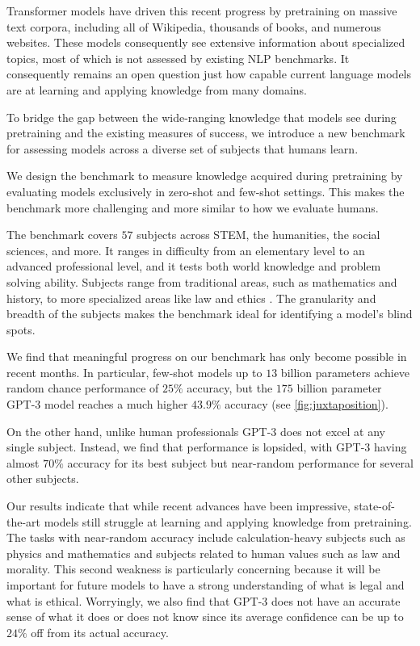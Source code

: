 Transformer models have driven this recent progress by pretraining on massive text corpora, including all of Wikipedia, thousands of books, and numerous websites. These models consequently see extensive information about specialized topics, most of which is not assessed by existing NLP benchmarks. It consequently remains an open question just how capable current language models are at learning and applying knowledge from many domains.

To bridge the gap between the wide-ranging knowledge that models see during pretraining and the existing measures of success, we introduce a new benchmark for assessing models across a diverse set of subjects that humans learn.

We design the benchmark to measure knowledge acquired during pretraining by evaluating models exclusively in zero-shot and few-shot settings. This makes the benchmark more challenging and more similar to how we evaluate humans.

The benchmark covers $57$ subjects across STEM, the humanities, the social sciences, and more. It ranges in difficulty from an elementary level to an advanced professional level, and it tests both world knowledge and problem solving ability. Subjects range from traditional areas, such as mathematics and history, to more specialized areas like law and ethics \citep{hendrycks2020ethicsdataset}. The granularity and breadth of the subjects makes the benchmark ideal for identifying a model's blind spots. 

We find that meaningful progress on our benchmark has only become possible in recent months. In particular, few-shot models up to $13$ billion parameters \citep{brown2020gpt3} achieve random chance performance of $25\%$ accuracy, but the $175$ billion parameter GPT-3 model reaches a much higher $43.9\%$ accuracy (see \ref{fig:juxtaposition}). 

On the other hand, unlike human professionals GPT-3 does not excel at any single subject. Instead, we find that performance is lopsided, with GPT-3 having almost $70\%$ accuracy for its best subject but near-random performance for several other subjects.

Our results indicate that while recent advances have been impressive, state-of-the-art models still struggle at learning and applying knowledge from pretraining. The tasks with near-random accuracy include calculation-heavy subjects such as physics and mathematics and subjects related to human values such as law and morality. This second weakness is particularly concerning because it will be important for future models to have a strong understanding of what is legal and what is ethical. Worryingly, we also find that GPT-3 does not have an accurate sense of what it does or does not know since its average confidence can be up to $24\%$ off from its actual accuracy.

